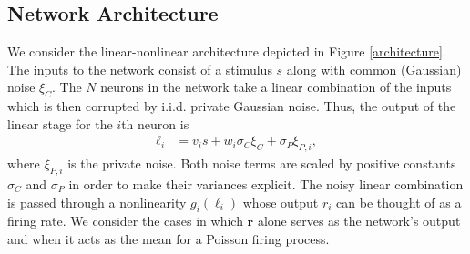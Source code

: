 \documentclass[12pt]{article}
\begin{document}
\subsection{Network Architecture}
We consider the linear-nonlinear architecture depicted in Figure \ref{architecture}. The inputs to the network consist of a stimulus $s$ along with common (Gaussian) noise $\xi_C$. The $N$ neurons in the network take a linear combination of the inputs which is then corrupted by i.i.d. private Gaussian noise. Thus, the output of the linear stage for the $i$th neuron is 
\begin{align}
\ell_i &= v_i s + w_i \sigma_C \xi_C + \sigma_P\xi_{P,i},
\end{align}
where $\xi_{P,i}$ is the private noise. Both noise terms are scaled by positive constants $\sigma_C$ and $\sigma_P$ in order to make their variances explicit. The noisy linear combination is passed through a nonlinearity $g_i(\ell_i)$ whose output $r_i$ can be thought of as a firing rate. We consider the cases in which $\mathbf{r}$ alone serves as the network's output and when it acts as the mean for a Poisson firing process.
\end{document}

